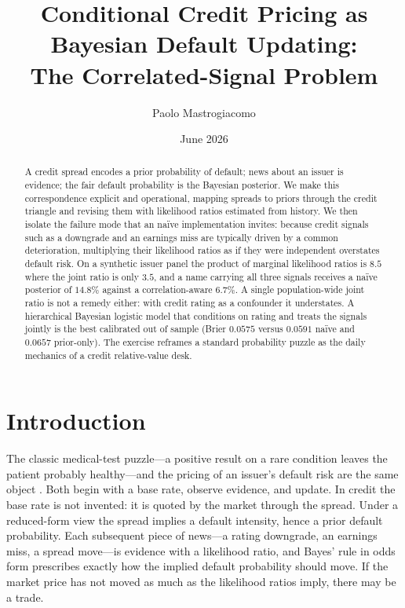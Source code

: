 \documentclass[11pt]{article}
\title{\textbf{Conditional Credit Pricing as Bayesian Default Updating:\\
The Correlated-Signal Problem}}
\author{Paolo Mastrogiacomo}
\date{June 2026}
\begin{document}
\maketitle

\begin{abstract}
A credit spread encodes a prior probability of default; news about an issuer is
evidence; the fair default probability is the Bayesian posterior. We make this
correspondence explicit and operational, mapping spreads to priors through the
credit triangle and revising them with likelihood ratios estimated from history.
We then isolate the failure mode that an na\"ive implementation invites: because
credit signals such as a downgrade and an earnings miss are typically driven by a
common deterioration, multiplying their likelihood ratios as if they were
independent overstates default risk. On a synthetic issuer panel the product of
marginal likelihood ratios is $8.5$ where the joint ratio is only $3.5$, and a
name carrying all three signals receives a na\"ive posterior of $14.8\%$ against a
correlation-aware $6.7\%$. A single population-wide joint ratio is not a remedy
either: with credit rating as a confounder it understates. A hierarchical Bayesian
logistic model that conditions on rating and treats the signals jointly is the best
calibrated out of sample (Brier $0.0575$ versus $0.0591$ na\"ive and $0.0657$
prior-only). The exercise reframes a standard probability puzzle as the daily
mechanics of a credit relative-value desk.
\end{abstract}

\section{Introduction}
The classic medical-test puzzle---a positive result on a rare condition leaves the
patient probably healthy---and the pricing of an issuer's default risk are the same
object \citep{gigerenzer1995}. Both begin with a base rate, observe evidence, and
update. In credit the base rate is not invented: it is quoted by the market through
the spread. Under a reduced-form view \citep{jarrowturnbull1995,duffiesingleton1999}
the spread implies a default intensity, hence a prior default probability. Each
subsequent piece of news---a rating downgrade, an earnings miss, a spread move---is
evidence with a likelihood ratio, and Bayes' rule in odds form prescribes exactly
how the implied default probability should move. If the market price has not moved
as much as the likelihood ratios imply, there may be a trade.
\end{document}
